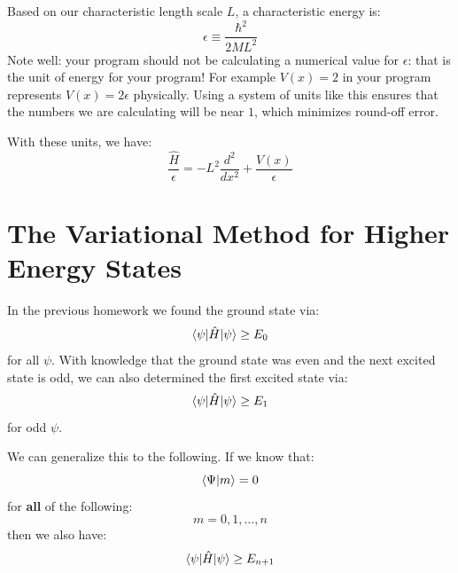 \documentclass[12pt]{article}
\begin{document}
Based on our characteristic length scale $L$, a characteristic energy is:
\begin{equation}
\epsilon \equiv \frac{\hbar^2}{2 M L^2}
\end{equation}
Note well:  your program should not be calculating a numerical value for
$\epsilon$: that is the unit of energy for your program!  For example
$V(x) = 2$ in your program represents $V(x) = 2 \epsilon$
physically.  Using a system of units like this ensures that the
numbers we are calculating will be near $1$, which minimizes round-off
error.

With these units, we have:
\begin{equation}
\frac{\hat{H}}{\epsilon} = -L^2\frac{d^2}{dx^2} + \frac{V(x)}{\epsilon}
\end{equation}

\section{The Variational Method for Higher Energy States}

In the previous homework we found the ground state via:
$$\braket{\psi|\hat{H}|\psi} \geq E_0$$
for all $\psi$.  With knowledge that the ground state was even and the next excited state is odd, we can also determined the first excited state via:
$$\braket{\psi|\hat{H}|\psi} \geq E_1$$
for odd $\psi$.

We can generalize this to the following.  If we know that:
$$\braket{\Psi|m} = 0$$
for {\bf all} of the following:
$$m=0,1,\ldots,n$$
then we also have:  
$$\braket{\psi|\hat{H}|\psi} \geq E_{n+1}$$
\end{document}
